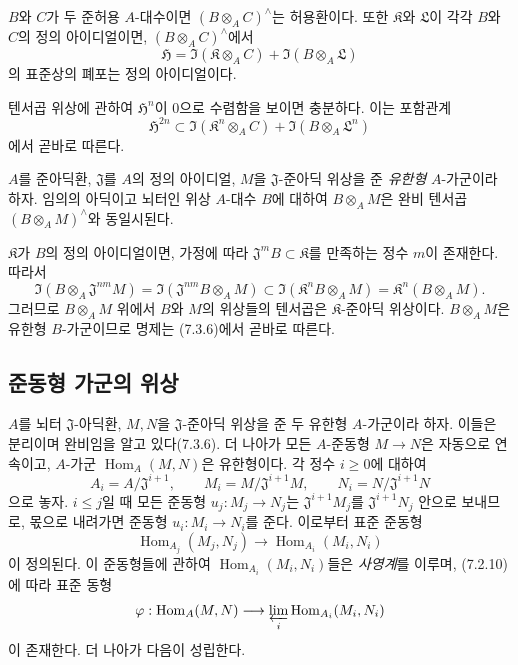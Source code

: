 \begin{proposition}[7.7.7]
\label{0.7.7.7-ko}
$B$와 $C$가 두 준허용 $A$-대수이면
$(B\otimes_A C)^\wedge$는 허용환이다. 또한 $\mathfrak K$와
$\mathfrak L$이 각각 $B$와 $C$의 정의 아이디얼이면,
$(B\otimes_A C)^\wedge$에서
\[
  \mathfrak H=
  \Im(\mathfrak K\otimes_A C)+
  \Im(B\otimes_A\mathfrak L)
\]
의 표준상의 폐포는 정의 아이디얼이다.
\end{proposition}

텐서곱 위상에 관하여 $\mathfrak H^n$이 $0$으로 수렴함을 보이면
충분하다. 이는 포함관계
\[
  \mathfrak H^{2n}\subset
  \Im(\mathfrak K^n\otimes_A C)+
  \Im(B\otimes_A\mathfrak L^n)
\]
에서 곧바로 따른다.

\begin{proposition}[7.7.8]
\label{0.7.7.8-ko}
$A$를 준아딕환, $\mathfrak J$를 $A$의 정의 아이디얼,
$M$을 $\mathfrak J$-준아딕 위상을 준 \emph{유한형} $A$-가군이라
하자. 임의의 아딕이고 뇌터인 위상 $A$-대수 $B$에 대하여
$B\otimes_A M$은 완비 텐서곱
$(B\otimes_A M)^\wedge$와 동일시된다.
\end{proposition}

$\mathfrak K$가 $B$의 정의 아이디얼이면, 가정에 따라
$\mathfrak J^mB\subset\mathfrak K$를 만족하는 정수 $m$이 존재한다.
따라서
\[
  \Im(B\otimes_A\mathfrak J^{nm}M)
  =\Im(\mathfrak J^{nm}B\otimes_A M)
  \subset\Im(\mathfrak K^nB\otimes_A M)
  =\mathfrak K^n(B\otimes_A M).
\]
그러므로 $B\otimes_A M$ 위에서 $B$와 $M$의 위상들의 텐서곱은
$\mathfrak K$-준아딕 위상이다. $B\otimes_A M$은 유한형
$B$-가군이므로 명제는 (7.3.6)에서 곧바로 따른다.

\subsection{준동형 가군의 위상}
\label{subsection:0.7.8-ko}

\begin{env}[7.8.1]
\label{0.7.8.1-ko}
$A$를 뇌터 $\mathfrak J$-아딕환, $M,N$을 $\mathfrak J$-준아딕 위상을
준 두 유한형 $A$-가군이라 하자. 이들은 분리이며 완비임을 알고
있다(7.3.6). 더 나아가 모든 $A$-준동형 $M\to N$은 자동으로
연속이고, $A$-가군 $\operatorname{Hom}_A(M,N)$은 유한형이다.
각 정수 $i\geq0$에 대하여
\[
  A_i=A/\mathfrak J^{i+1},
  \qquad
  M_i=M/\mathfrak J^{i+1}M,
  \qquad
  N_i=N/\mathfrak J^{i+1}N
\]
으로 놓자. $i\leq j$일 때 모든 준동형 $u_j:M_j\to N_j$는
$\mathfrak J^{i+1}M_j$를 $\mathfrak J^{i+1}N_j$ 안으로 보내므로,
몫으로 내려가면 준동형 $u_i:M_i\to N_i$를 준다. 이로부터 표준
준동형
\[
  \operatorname{Hom}_{A_j}(M_j,N_j)
  \longrightarrow
  \operatorname{Hom}_{A_i}(M_i,N_i)
\]
이 정의된다. 이 준동형들에 관하여
$\operatorname{Hom}_{A_i}(M_i,N_i)$들은 \emph{사영계}를 이루며,
(7.2.10)에 따라 표준 동형
\[
  \varphi:\operatorname{Hom}_A(M,N)
  \longrightarrow
  \varprojlim_i\operatorname{Hom}_{A_i}(M_i,N_i)
\]
이 존재한다. 더 나아가 다음이 성립한다.
\end{env}


